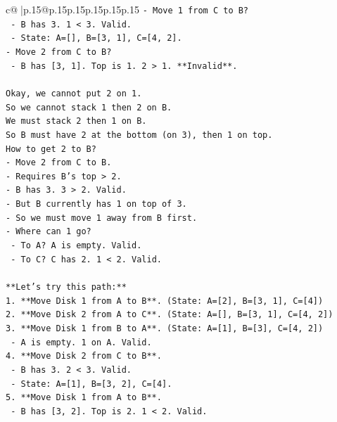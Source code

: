 \documentclass{article}
\begin{document}
{\begin{supertabular}{c@{$\;$}|p{.15\linewidth}@{}p{.15\linewidth}p{.15\linewidth}p{.15\linewidth}p{.15\linewidth}p{.15\linewidth}}
{{{\texttt{{-} Move 1 from C to B?} \\
\texttt{  {-} B has 3. 1 < 3. Valid.} \\
\texttt{  {-} State: A={[}{]}, B={[}3, 1{]}, C={[}4, 2{]}.} \\
\texttt{{-} Move 2 from C to B?} \\
\texttt{  {-} B has {[}3, 1{]}. Top is 1. 2 > 1. **Invalid**.} \\
\\ 
\texttt{Okay, we cannot put 2 on 1.} \\
\texttt{So we cannot stack 1 then 2 on B.} \\
\texttt{We must stack 2 then 1 on B.} \\
\texttt{So B must have 2 at the bottom (on 3), then 1 on top.} \\
\texttt{How to get 2 to B?} \\
\texttt{{-} Move 2 from C to B.} \\
\texttt{{-} Requires B's top > 2.} \\
\texttt{{-} B has 3. 3 > 2. Valid.} \\
\texttt{{-} But B currently has 1 on top of 3.} \\
\texttt{{-} So we must move 1 away from B first.} \\
\texttt{{-} Where can 1 go?} \\
\texttt{  {-} To A? A is empty. Valid.} \\
\texttt{  {-} To C? C has 2. 1 < 2. Valid.} \\
\\ 
\texttt{**Let's try this path:**} \\
\texttt{1. **Move Disk 1 from A to B**. (State: A={[}2{]}, B={[}3, 1{]}, C={[}4{]})} \\
\texttt{2. **Move Disk 2 from A to C**. (State: A={[}{]}, B={[}3, 1{]}, C={[}4, 2{]})} \\
\texttt{3. **Move Disk 1 from B to A**. (State: A={[}1{]}, B={[}3{]}, C={[}4, 2{]})} \\
\texttt{   {-} A is empty. 1 on A. Valid.} \\
\texttt{4. **Move Disk 2 from C to B**.} \\
\texttt{   {-} B has 3. 2 < 3. Valid.} \\
\texttt{   {-} State: A={[}1{]}, B={[}3, 2{]}, C={[}4{]}.} \\
\texttt{5. **Move Disk 1 from A to B**.} \\
\texttt{   {-} B has {[}3, 2{]}. Top is 2. 1 < 2. Valid.} \\
}}}
\end{supertabular}}
\end{document}
